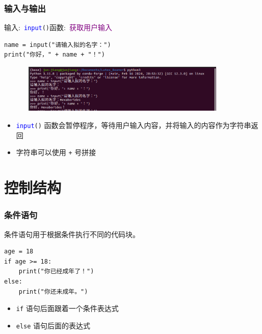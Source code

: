 %
\begin{frame}[fragile]
    \frametitle{输入与输出}
    输入:~\texttt{\textcolor{blue}{input}()}函数:~\textcolor{purple}{获取用户输入}
    \begin{lstlisting}[style=pythonstyle]
name = input("请输入拟的名字：")
print("你好，" + name + "！")
    \end{lstlisting}
\begin{figure}[h!]
\centering
\includegraphics[height=0.9in, width=4.0in, viewport=0 9 901 211,clip]{Figures/python_Input-output.png}
\label{Python-Input_Output}
\end{figure}
\vspace*{-0.15in}
    \begin{itemize}
	    \item \texttt{\textcolor{blue}{input}()} 函数会暂停程序，等待用户输入内容，并将输入的内容作为字符串返回
	    \item 字符串可以使用 \texttt{+} 号拼接
    \end{itemize}
\end{frame}
%
\section{控制结构}
\begin{frame}[fragile]
    \frametitle{条件语句}
    条件语句用于根据条件执行不同的代码块。
    \begin{lstlisting}[style=pythonstyle]
age = 18
if age >= 18:
    print("你已经成年了！")
else:
    print("你还未成年。")
    \end{lstlisting}
    \begin{itemize}
	    \item \texttt{if} 语句后面跟着一个条件表达式\\
		    {\fontsize{8.2pt}{4.2pt}}
	    \item \texttt{else} 语句后面的表达式\\
		    {\fontsize{8.2pt}{4.2pt}}
    \end{itemize}
\end{frame}

